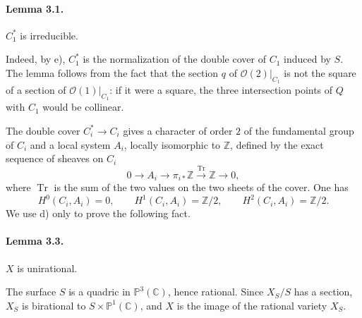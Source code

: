 \documentclass[10pt]{article}
\newcommand{\C}{\mathbb C}
\newcommand{\Pj}{\mathbb P}
\newcommand{\Z}{\mathbb Z}
\newcommand{\Tr}{\operatorname{Tr}}
\begin{document}
\paragraph{Lemma 3.1.} \(C_1^*\) is irreducible.

Indeed, by e), \(C_1^*\) is the normalization of the double cover of \(C_1\) induced by \(S\). The lemma follows from the fact that the section \(q\) of \(\mathcal O(2)|_{C_1}\) is not the square of a section of \(\mathcal O(1)|_{C_1}\): if it were a square, the three intersection points of \(Q\) with \(C_1\) would be collinear.

The double cover \(C_i^*\to C_i\) gives a character of order \(2\) of the fundamental group of \(C_i\) and a local system \(A_i\), locally isomorphic to \(\Z\), defined by the exact sequence of sheaves on \(C_i\)
\[
0\longrightarrow A_i\longrightarrow \pi_{i*}\Z \xrightarrow{\Tr}\Z\longrightarrow0,
\]
where \(\Tr\) is the sum of the two values on the two sheets of the cover. One has
\[
\tag{3.2}
H^0(C_i,A_i)=0,
\qquad H^1(C_i,A_i)=\Z/2,
\qquad H^2(C_i,A_i)=\Z/2.
\]
We use d) only to prove the following fact.

\paragraph{Lemma 3.3.} \(X\) is unirational.

The surface \(S\) is a quadric in \(\Pj^3(\C)\), hence rational. Since \(X_S/S\) has a section, \(X_S\) is birational to \(S\times\Pj^1(\C)\), and \(X\) is the image of the rational variety \(X_S\).
\end{document}
